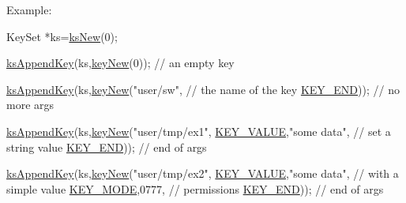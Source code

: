 \begin{DoxyParagraph}{Example\-:}

\begin{DoxyCode}
KeySet *ks=\hyperlink{group__keyset_ga671e1aaee3ae9dc13b4834a4ddbd2c3c}{ksNew}(0);

\hyperlink{group__keyset_gaa5a1d467a4d71041edce68ea7748ce45}{ksAppendKey}(ks,\hyperlink{group__key_gaf6893c038b3ebee90c73a9ea8356bebf}{keyNew}(0));       \textcolor{comment}{// an empty key}

\hyperlink{group__keyset_gaa5a1d467a4d71041edce68ea7748ce45}{ksAppendKey}(ks,\hyperlink{group__key_gaf6893c038b3ebee90c73a9ea8356bebf}{keyNew}(\textcolor{stringliteral}{"user/sw"},              \textcolor{comment}{// the name of
       the key}
        \hyperlink{group__key_gga91fb3178848bd682000958089abbaf40aa8adb6fcb92dec58fb19410eacfdd403}{KEY\_END}));                      \textcolor{comment}{// no more args}

\hyperlink{group__keyset_gaa5a1d467a4d71041edce68ea7748ce45}{ksAppendKey}(ks,\hyperlink{group__key_gaf6893c038b3ebee90c73a9ea8356bebf}{keyNew}(\textcolor{stringliteral}{"user/tmp/ex1"},
        \hyperlink{group__key_gga91fb3178848bd682000958089abbaf40ac66e4a49d09212b79f5754ca6db5bd2e}{KEY\_VALUE},\textcolor{stringliteral}{"some data"},          \textcolor{comment}{// set a string value}
        \hyperlink{group__key_gga91fb3178848bd682000958089abbaf40aa8adb6fcb92dec58fb19410eacfdd403}{KEY\_END}));                      \textcolor{comment}{// end of args}

\hyperlink{group__keyset_gaa5a1d467a4d71041edce68ea7748ce45}{ksAppendKey}(ks,\hyperlink{group__key_gaf6893c038b3ebee90c73a9ea8356bebf}{keyNew}(\textcolor{stringliteral}{"user/tmp/ex2"},
        \hyperlink{group__key_gga91fb3178848bd682000958089abbaf40ac66e4a49d09212b79f5754ca6db5bd2e}{KEY\_VALUE},\textcolor{stringliteral}{"some data"},          \textcolor{comment}{// with a simple value}
        \hyperlink{group__key_gga91fb3178848bd682000958089abbaf40a1b0a91ff3a855d6993930ebf0abaa518}{KEY\_MODE},0777,                  \textcolor{comment}{// permissions}
        \hyperlink{group__key_gga91fb3178848bd682000958089abbaf40aa8adb6fcb92dec58fb19410eacfdd403}{KEY\_END}));                      \textcolor{comment}{// end of args}


\end{DoxyCode}
\end{DoxyParagraph}
